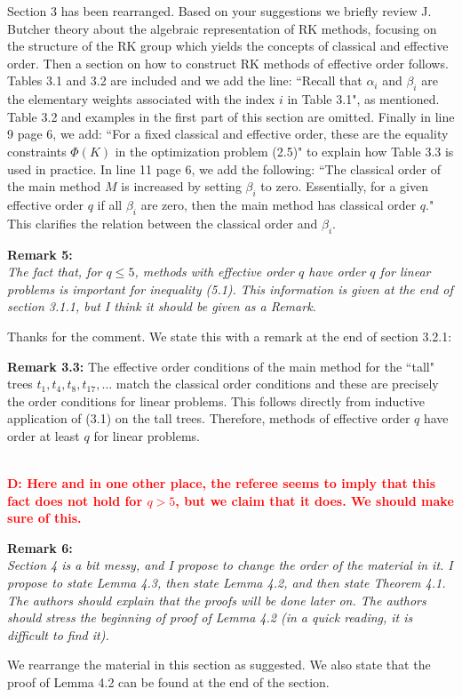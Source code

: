 \documentclass[12pt]{article}
\newcommand{\remark}[2]{\vspace{25pt} \noindent \textbf{Remark #1:\newline} \textit{#2}\vspace{15pt}}
\renewcommand{\newline}{\vspace{15pt}\\}
\newcommand{\david}[1]{\textcolor{red}{\\\textbf{D: \footnotesize #1}\\}}
\begin{document}
Section 3 has been rearranged. 
Based on your suggestions we briefly review J. Butcher theory about the algebraic representation
of RK methods, focusing on the structure of the RK group which yields the concepts of classical 
and effective order.
Then a section on how to construct RK methods of effective order follows.
Tables 3.1 and 3.2 are included and we add the line:
``Recall that $\alpha_i$ and $\beta_i$ are the elementary weights associated 
with the index $i$ in Table 3.1",
as mentioned.
Table 3.2 and examples in the first part of this section are omitted. 
Finally in line 9 page 6, we add:
``For a fixed classical and effective order, these are the equality constraints 
$\Phi(K)$ in the optimization problem (2.5)"
to explain how Table 3.3 is used in practice.
In line 11 page 6, we add the following:
``The classical order of the main method $M$ is increased by setting $\beta_i$
to zero. 
Essentially, for a given effective order $q$ if all $\beta_i$ are zero, then
the main method has classical order $q$."
This clarifies the relation between the classical order and $\beta_i$.

\remark{5}{
The fact that, for $q \leq 5$, methods with effective order $q$ have order $q$ 
for linear problems is important for inequality (5.1). 
This information is given at the end of section 3.1.1, but I think it should be given as a Remark.}

Thanks for the comment. We state this with a remark at the end of section 3.2.1: 

\textbf{Remark 3.3:} The effective order conditions of the main method for the ``tall" trees 
$t_1, t_4, t_8, t_{17}, \dots$ match the classical order conditions
and these are precisely the order conditions for linear problems.
This follows directly from inductive application of (3.1)
on the tall trees.
Therefore, methods of effective order $q$ have order at least $q$ for linear problems.

\david{Here and in one other place, the referee seems to imply that this fact does not
hold for $q>5$, but we claim that it does.  We should make sure of this.}

\remark{6}{
Section 4 is a bit messy, and I propose to change the order of the material in it. 
I propose to state Lemma 4.3, then state Lemma 4.2, and then state Theorem 4.1. 
The authors should explain that the proofs will be done later on. 
The authors should stress the beginning of proof of Lemma 4.2 (in a quick reading, 
it is difficult to find it).}

We rearrange the material in this section as suggested.
We also state that the proof of Lemma 4.2 can be found at the end of the section.
\end{document}
